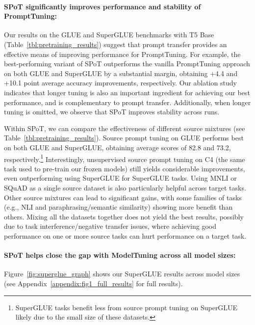 \paragraph{{{\small \sc \textbf{SPoT}}} significantly improves performance and stability of {\small \sc \textbf{PromptTuning}}:} Our results on the {\small \sc GLUE} and {\small \sc SuperGLUE} benchmarks with {\small \sc T5 Base} (Table~\ref{tbl:pretraining_results}) suggest that prompt transfer provides an effective means of improving performance for {\small \sc PromptTuning}. For example, the best-performing variant of {{\small \sc SPoT}} outperforms the vanilla {\small \sc PromptTuning} approach on both {\small \sc GLUE} and {\small \sc SuperGLUE} by a substantial margin, obtaining +4.4 and +10.1 point average accuracy improvements, respectively. Our ablation study indicates that longer tuning is also an important ingredient for achieving our best performance, and is complementary to prompt transfer. Additionally, when longer tuning is omitted, we observe that {{\small \sc SPoT}} improves stability across runs.

Within {{\small \sc SPoT}}, we can compare the effectiveness of different source mixtures (see Table~\ref{tbl:pretraining_results}). Source prompt tuning on {\small \sc GLUE} performs best on both {\small \sc GLUE} and {\small \sc SuperGLUE}, obtaining average scores of 82.8 and 73.2, respectively.\footnote{{\scriptsize \sc SuperGLUE} tasks benefit less from source prompt tuning on {\scriptsize \sc SuperGLUE} likely due to the small size of these datasets.} Interestingly, unsupervised source prompt tuning on {\small \sc C4} (the same task used to pre-train our frozen models) still yields considerable improvements, even outperforming using {\small \sc SuperGLUE} for {\small \sc SuperGLUE} tasks. Using {\small \sc MNLI} or {\small \sc SQuAD} as a single source dataset is also particularly helpful across target tasks. Other source mixtures can lead to significant gains, with some families of tasks (e.g., {\small \sc NLI} and paraphrasing/semantic similarity) showing more benefit than others. Mixing all the datasets together does not yield the best results, possibly due to task interference/negative transfer issues, where achieving good performance on one or more source tasks can hurt performance on a target task.

\paragraph{{{\small \sc \textbf{SPoT}}} helps close the gap with {\small \sc \textbf{ModelTuning}} across all model sizes:} 
Figure~\ref{fig:superglue_graph} shows our {\small \sc SuperGLUE} results across model sizes (see Appendix~\ref{appendix:fig1_full_results} for full results).

